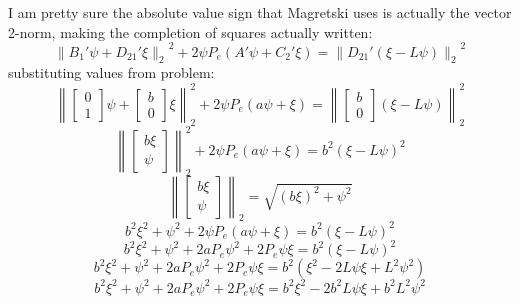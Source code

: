 \begin{example}
  I am pretty sure the absolute value sign that Magretski uses is actually the vector 2-norm, making the completion of squares actually written:
  \begin{equation*}
    {\|{B_{1}}'\psi+{D_{21}}'\xi\|_{2}}^{2}+2\psi P_{e}(A'\psi+{C_{2}}'\xi)={\|{D_{21}}'(\xi-L\psi)\|_{2}}^{2}
  \end{equation*}
  substituting values from problem:
  \begin{equation*}
    \left\|
      \begin{bmatrix}
        0 \\ 1
      \end{bmatrix}
      \psi+
      \begin{bmatrix}
        b \\ 0
      \end{bmatrix}\xi
    \right\|_{2}^{2}+
  2\psi P_{e}(a\psi+\xi)=
    \left\|
      \begin{bmatrix}
        b \\ 0
      \end{bmatrix}(\xi-L\psi)
    \right\|_{2}^{2}
  \end{equation*}
  \begin{equation*}
    \left\|
      \begin{bmatrix}
        b\xi \\
        \psi
      \end{bmatrix}
    \right\|_{2}^{2}+
    2\psi P_{e}(a\psi+\xi)=
    b^{2}(\xi-L\psi)^{2}
  \end{equation*}
  \begin{equation*}
    {\left\|\begin{bmatrix} b\xi \\ \psi \end{bmatrix}\right\|_{2}}=\sqrt{(b\xi)^{2}+\psi^{2}}
  \end{equation*}
  \begin{equation*}
    b^{2}\xi^{2}+\psi^{2}+2\psi P_{e}(a\psi+\xi)=b^{2}(\xi-L\psi)^{2}
  \end{equation*}
  \begin{equation*}
    b^{2}\xi^{2}+\psi^{2}+2aP_{e}\psi^{2}+2P_{e}\psi\xi=b^{2}(\xi-L\psi)^{2}
  \end{equation*}
  \begin{equation*}
    b^{2}\xi^{2}+\psi^{2}+2aP_{e}\psi^{2}+2P_{e}\psi\xi=b^{2}(\xi^{2}-2L\psi\xi+L^{2}\psi^{2})
  \end{equation*}
  \begin{equation*}
    b^{2}\xi^{2}+\psi^{2}+2aP_{e}\psi^{2}+2P_{e}\psi\xi=b^{2}\xi^{2}-2b^{2}L\psi\xi+b^{2}L^{2}\psi^{2}

\end{equation*}
\end{example}
